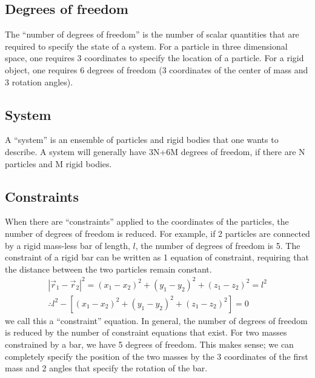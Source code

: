 \subsection{Degrees of freedom}
The ``number of degrees of freedom'' is the number of scalar quantities that are required to specify the state of a system. For a particle in three dimensional space, one requires 3 coordinates to specify the location of a particle. For a rigid object, one requires 6 degrees of freedom (3 coordinates of the center of mass and 3 rotation angles).

\subsection{System}
A ``system'' is an ensemble of particles and rigid bodies that one wants to describe. A system will generally have 3N+6M degrees of freedom, if there are N particles and M rigid bodies.

\subsection{Constraints}
When there are ``constraints'' applied to the coordinates of the particles, the number of degrees of freedom is reduced. For example, if 2 particles are connected by a rigid mass-less bar of length, $l$, the number of degrees of freedom is 5. The constraint of a rigid bar can be written as 1 equation of constraint, requiring that the distance between the two particles remain constant.
\begin{align}
|\vec{r}_1-\vec{r}_2|^2=(x_1-x_2)^2+(y_1-y_2)^2+(z_1-z_2)^2=l^2\nonumber\\
\therefore l^2-\left[(x_1-x_2)^2+(y_1-y_2)^2+(z_1-z_2)^2\right]=0
\label{eqn:2massbarrholcons}
\end{align}
we call this a ``constraint'' equation. In general, the number of degrees of freedom is reduced by the number of constraint equations that exist. For two masses constrained by a bar, we have 5 degrees of freedom. This makes sense; we can completely specify the position of the two masses by the 3 coordinates of the first mass and 2 angles that specify the rotation of the bar.


